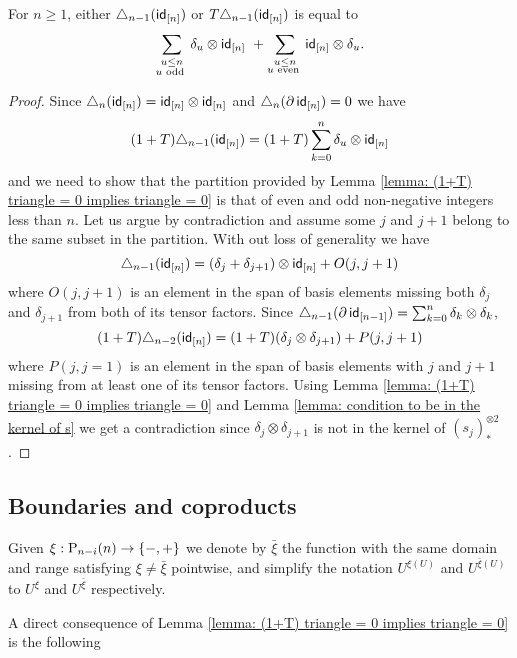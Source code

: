 \begin{lemma}
	For $n \geq 1$, either $\triangle_{n-1}(\id_{[n]})$ or $T \triangle_{n-1}(\id_{[n]})$ is equal to
	\[
	\sum_{\substack{u \leq n \\ u \text{ odd }}} \delta_u \otimes \id_{[n]} \ + \sum_{\substack{u \leq n \\ u \text{ even }}} \id_{[n]} \otimes \delta_u.
	\]
\end{lemma}

\begin{proof}
	Since $\triangle_{n}(\id_{[n]}) = \id_{[n]} \otimes \id_{[n]}$ and $\triangle_{n}(\partial\, \id_{[n]}) = 0$ we have
	\[
	(1+T) \triangle_{n-1}(\id_{[n]}) = (1 + T) \sum_{k = 0}^n \delta_u \otimes \id_{[n]}
	\]
	and we need to show that the partition provided by Lemma \ref{lemma: (1+T) triangle = 0 implies triangle = 0} is that of even and odd non-negative integers less than $n$. Let us argue by contradiction and assume some $j$ and $j+1$ belong to the same subset in the partition. With out loss of generality we have
	\[
	\triangle_{n-1}(\id_{[n]}) = (\delta_j + \delta_{j+1}) \otimes \id_{[n]} + O(j, j+1)
	\]
	where $O(j, j+1)$ is an element in the span of basis elements missing both $\delta_j$ and $\delta_{j+1}$ from both of its tensor factors. Since $\triangle_{n-1}(\partial\, \id_{[n-1]}) = \sum_{k=0}^n \delta_k \otimes \delta_k$,
	\[
	(1+T) \triangle_{n-2}(\id_{[n]}) = (1+T)(\delta_j \otimes \delta_{j+1}) + P(j, j+1)
	\]
	where $P(j, j=1)$ is an element in the span of basis elements with $j$ and $j+1$ missing from at least one of its tensor factors. Using Lemma \ref{lemma: (1+T) triangle = 0 implies triangle = 0} and Lemma \ref{lemma: condition to be in the kernel of s} we get a contradiction since $\delta_j \otimes \delta_{j+1}$ is not in the kernel of $(s_j)_\ast^{\otimes 2}$.
\end{proof}

\subsection{Boundaries and coproducts}

\begin{notation}
	Given $\xi : \P_{n-i}(n) \to \{-, +\}$ we denote by $\bar{\xi}$ the function with the same domain and range satisfying $\xi \neq \bar{\xi}$ pointwise, and simplify the notation $U^{\xi(U)}$ and $U^{\bar{\xi}(U)}$ to $U^\xi$ and $U^{\bar{\xi}}$ respectively.
\end{notation}

A direct consequence of Lemma \ref{lemma: (1+T) triangle = 0 implies triangle = 0} is the following

